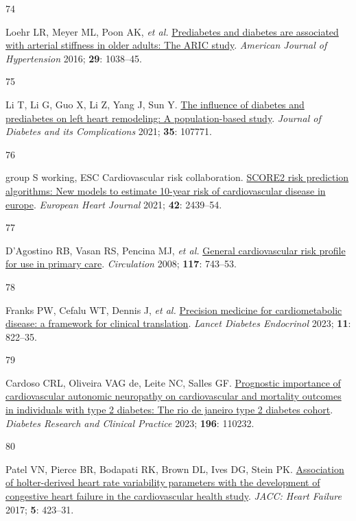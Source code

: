 \documentclass[
  a4paper,
  headsepline=true,
  open=left]{scrbook}
\newlength{\cslhangindent}
\newlength{\csllabelwidth}
\newlength{\cslentryspacingunit} %
\newenvironment{CSLReferences}[2] %
 {%
  \setlength{\parindent}{0pt}
  \ifodd #1
  \let\oldpar\par
  \def\par{\hangindent=\cslhangindent\oldpar}
  \fi
  \setlength{\parskip}{#2\cslentryspacingunit}
 }%
 {}
\newcommand{\CSLLeftMargin}[1]{\parbox[t]{\csllabelwidth}{#1}}
\newcommand{\CSLRightInline}[1]{\parbox[t]{\linewidth - \csllabelwidth}{#1}\break}
\begin{document}
\begin{CSLReferences}{0}{0}
\leavevmode{}%
\CSLLeftMargin{74 }%
\CSLRightInline{Loehr LR, Meyer ML, Poon AK, \emph{et al.}
\href{https://doi.org/10.1093/ajh/hpw036}{Prediabetes and diabetes are
associated with arterial stiffness in older adults: The ARIC study}.
\emph{American Journal of Hypertension} 2016; \textbf{29}: 1038--45.}

\leavevmode{}%
\CSLLeftMargin{75 }%
\CSLRightInline{Li T, Li G, Guo X, Li Z, Yang J, Sun Y.
\href{https://doi.org/10.1016/j.jdiacomp.2020.107771}{The influence of
diabetes and prediabetes on left heart remodeling: A population-based
study}. \emph{Journal of Diabetes and its Complications} 2021;
\textbf{35}: 107771.}

\leavevmode{}%
\CSLLeftMargin{76 }%
\CSLRightInline{group S working, ESC Cardiovascular risk collaboration.
\href{https://doi.org/10.1093/eurheartj/ehab309}{SCORE2 risk prediction
algorithms: New models to estimate 10-year risk of cardiovascular
disease in europe}. \emph{European Heart Journal} 2021; \textbf{42}:
2439--54.}

\leavevmode{}%
\CSLLeftMargin{77 }%
\CSLRightInline{D'Agostino RB, Vasan RS, Pencina MJ, \emph{et al.}
\href{https://doi.org/10.1161/CIRCULATIONAHA.107.699579}{General
cardiovascular risk profile for use in primary care}. \emph{Circulation}
2008; \textbf{117}: 743--53.}

\leavevmode{}%
\CSLLeftMargin{78 }%
\CSLRightInline{Franks PW, Cefalu WT, Dennis J, \emph{et al.}
\href{https://doi.org/10.1016/s2213-8587(23)00165-1}{Precision medicine
for cardiometabolic disease: a framework for clinical translation}.
\emph{Lancet Diabetes Endocrinol} 2023; \textbf{11}: 822--35.}

\leavevmode{}%
\CSLLeftMargin{79 }%
\CSLRightInline{Cardoso CRL, Oliveira VAG de, Leite NC, Salles GF.
\href{https://doi.org/10.1016/j.diabres.2022.110232}{Prognostic
importance of cardiovascular autonomic neuropathy on cardiovascular and
mortality outcomes in individuals with type 2 diabetes: The rio de
janeiro type 2 diabetes cohort}. \emph{Diabetes Research and Clinical
Practice} 2023; \textbf{196}: 110232.}

\leavevmode{}%
\CSLLeftMargin{80 }%
\CSLRightInline{Patel VN, Pierce BR, Bodapati RK, Brown DL, Ives DG,
Stein PK. \href{https://doi.org/10.1016/j.jchf.2016.12.015}{Association
of holter-derived heart rate variability parameters with the development
of congestive heart failure in the cardiovascular health study}.
\emph{JACC: Heart Failure} 2017; \textbf{5}: 423--31.}


\end{CSLReferences}
\end{document}
